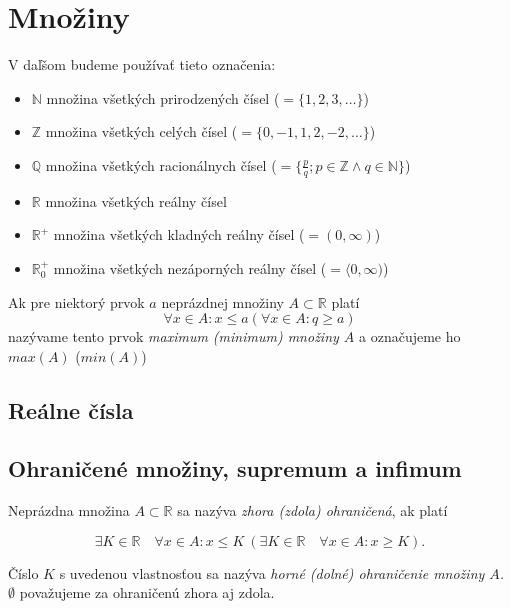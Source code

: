 \chapter{Množiny}

V daľšom budeme používať tieto označenia:
\begin{itemize}[label=]
  \item $\mathbb{N}$ množina všetkých prirodzených čísel ($= \{ 1, 2, 3, \ldots \}$)
  \item $\mathbb{Z}$ množina všetkých celých čísel ($= \{ 0, -1, 1, 2, -2, \ldots \}$)
  \item $\mathbb{Q}$ množina všetkých racionálnych čísel
    ($= \{ \frac{p}{q}; p \in \mathbb{Z} \land q \in \mathbb{N} \}$)
  \item $\mathbb{R}$ množina všetkých reálny čísel
  \item $\mathbb{R}^+$ množina všetkých kladných reálny čísel ($= ( 0, \infty )$)
  \item $\mathbb{R}^+_0$ množina všetkých nezáporných reálny čísel
    ($= \langle 0, \infty )$)
\end{itemize}
Ak pre niektorý prvok $a$ neprázdnej množiny $A \subset \mathbb{R}$ platí
$$\forall x \in A : x \leq a (\forall x \in A: q \geq a)$$
nazývame tento prvok \emph{maximum (minimum) množiny $A$} a označujeme ho
$max(A)$ ($min(A)$)

\section{Reálne čísla}

\begin{enumerate}[resume]
\end{enumerate}

\section{Ohraničené množiny, supremum a infimum}

Neprázdna množina $A \subset \mathbb{R}$ sa nazýva \textit{zhora (zdola)
ohraničená}, ak platí

$$
\exists K \in  \mathbb{R} \quad \forall x \in A: x \leq K \:
(\exists K \in \mathbb{R} \quad \forall x \in A: x \geq K).
$$

Číslo $K$ s uvedenou vlastnosťou sa nazýva \textit{horné (dolné)
ohraničenie množiny $A$.} $\emptyset$ považujeme za ohraničenú zhora aj zdola.

